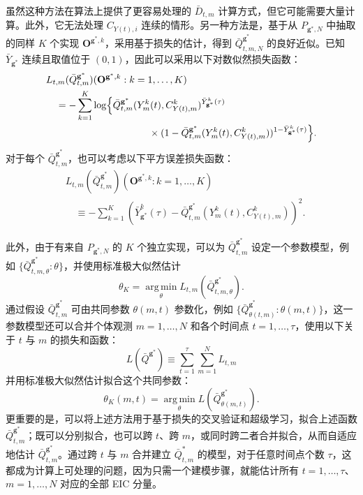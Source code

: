虽然这种方法在算法上提供了更容易处理的 $\bar D_{t,m}$ 计算方式，但它可能需要大量计算。此外，它无法处理 $C_{Y(t),i}$ 连续的情形。另一种方法是，基于从 $P_{\mathbf g^*,N}$ 中抽取的同样 $K$ 个实现 $\mathbf O^{\mathbf g^*,k}$，采用基于损失的估计，得到 $\bar Q^{\mathbf g^*}_{t,m,N}$ 的良好近似。已知 $\bar Y_{\mathbf g^*}$ 连续且取值位于 $(0,1)$，因此可以采用以下对数似然损失函数：
\[
\begin{aligned}
 &L_{t,m}(\bar Q^{\mathbf g^*}_{t,m})(\mathbf O^{\mathbf g^*,k}:k=1,\ldots,K)\\
 &\quad=-\sum_{k=1}^K\log\Bigl\{
   \bar Q^{\mathbf g^*}_{t,m}(Y_m^k(t),C^k_{Y(t),m})^{\bar Y^k_{\mathbf g^*}(\tau)}\\
 &\hspace{37mm}{}\times(1-\bar Q^{\mathbf g^*}_{t,m}(Y_m^k(t),C^k_{Y(t),m}))^{1-\bar Y^k_{\mathbf g^*}(\tau)}\Bigr\}.
\end{aligned}
\]
对于每个 $\bar Q^{\mathbf g^*}_{t,m}$，也可以考虑以下平方误差损失函数：
\[
\begin{aligned}
 &L_{t,m}(\bar Q^{\mathbf g^*}_{t,m})(\mathbf O^{\mathbf g^*,k}:k=1,\ldots,K)\\
 &\quad\equiv-\sum_{k=1}^K
       (\bar Y^k_{\mathbf g^*}(\tau)-\bar Q^{\mathbf g^*}_{t,m}(Y_m^k(t),C^k_{Y(t),m}))^2.
\end{aligned}
\]

此外，由于有来自 $P_{\mathbf g^*,N}$ 的 $K$ 个独立实现，可以为 $\bar Q^{\mathbf g^*}_{t,m}$ 设定一个参数模型，例如 $\{\bar Q^{\mathbf g^*}_{t,m,\theta}:\theta\}$，并使用标准极大似然估计
\[
 \theta_K=\operatorname*{arg\,min}_{\theta}L_{t,m}(\bar Q^{\mathbf g^*}_{t,m,\theta}).
\]
通过假设 $\bar Q^{\mathbf g^*}_{t,m}$ 可由共同参数 $\theta(m,t)$ 参数化，例如 $\{\bar Q^{\mathbf g^*}_{\theta(t,m)}:\theta(m,t)\}$，这一参数模型还可以合并个体观测 $m=1,\ldots,N$ 和各个时间点 $t=1,\ldots,\tau$，使用以下关于 $t$ 与 $m$ 的损失和函数：
\[
 L(\bar Q^{\mathbf g^*})\equiv\sum_{t=1}^\tau\sum_{m=1}^NL_{t,m}
\]
并用标准极大似然估计拟合这个共同参数：
\[
 \theta_K(m,t)=\operatorname*{arg\,min}_{\theta}L(\bar Q^{\mathbf g^*}_{\theta(m,t)}).
\]
更重要的是，可以将上述方法用于基于损失的交叉验证和超级学习，拟合上述函数 $\bar Q^{\mathbf g^*}_{t,m}$；既可以分别拟合，也可以跨 $t$、跨 $m$，或同时跨二者合并拟合，从而自适应地估计 $\bar Q^{\mathbf g^*}_{t,m}$。通过跨 $t$ 与 $m$ 合并建立 $\bar Q^*_{t,m}$ 的模型，对于任意时间点个数 $\tau$，这都成为计算上可处理的问题，因为只需一个建模步骤，就能估计所有 $t=1,\ldots,\tau$、$m=1,\ldots,N$ 对应的全部 EIC 分量。
